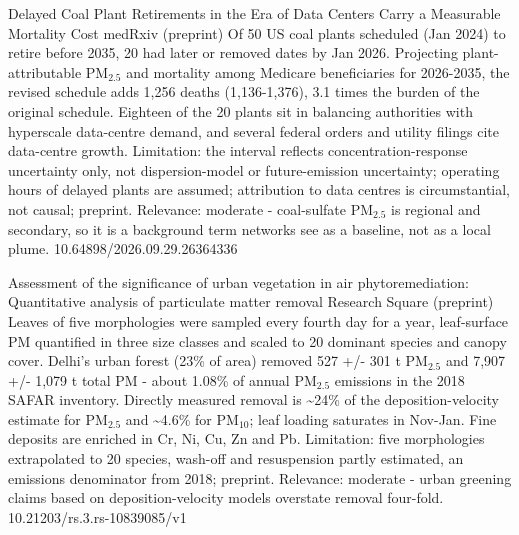 \documentclass[10pt]{article}
\begin{document}
{Delayed Coal Plant Retirements in the Era of Data Centers Carry a Measurable Mortality Cost}
{medRxiv (preprint)}
{Of 50 US coal plants scheduled (Jan 2024) to retire before 2035, 20 had later or removed dates by Jan 2026. Projecting plant-attributable PM$_{2.5}$ and mortality among Medicare beneficiaries for 2026-2035, the revised schedule adds 1,256 deaths (1,136-1,376), 3.1 times the burden of the original schedule. Eighteen of the 20 plants sit in balancing authorities with hyperscale data-centre demand, and several federal orders and utility filings cite data-centre growth. Limitation: the interval reflects concentration-response uncertainty only, not dispersion-model or future-emission uncertainty; operating hours of delayed plants are assumed; attribution to data centres is circumstantial, not causal; preprint. Relevance: moderate - coal-sulfate PM$_{2.5}$ is regional and secondary, so it is a background term networks see as a baseline, not as a local plume.}
{10.64898/2026.09.29.26364336}

{Assessment of the significance of urban vegetation in air phytoremediation: Quantitative analysis of particulate matter removal}
{Research Square (preprint)}
{Leaves of five morphologies were sampled every fourth day for a year, leaf-surface PM quantified in three size classes and scaled to 20 dominant species and canopy cover. Delhi's urban forest (23\% of area) removed 527 +/- 301 t PM$_{2.5}$ and 7,907 +/- 1,079 t total PM - about 1.08\% of annual PM$_{2.5}$ emissions in the 2018 SAFAR inventory. Directly measured removal is \textasciitilde{}24\% of the deposition-velocity estimate for PM$_{2.5}$ and \textasciitilde{}4.6\% for PM$_{10}$; leaf loading saturates in Nov-Jan. Fine deposits are enriched in Cr, Ni, Cu, Zn and Pb. Limitation: five morphologies extrapolated to 20 species, wash-off and resuspension partly estimated, an emissions denominator from 2018; preprint. Relevance: moderate - urban greening claims based on deposition-velocity models overstate removal four-fold.}
{10.21203/rs.3.rs-10839085/v1}

\par{}\baselineskip{}\baselineskip
{}
\end{document}
